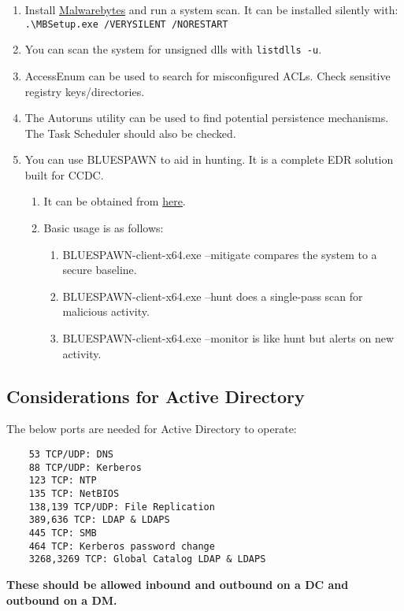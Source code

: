 \documentclass[12pt,letterpaper]{article}
\def\code#1{\textcolor{iris}{\texttt{#1}}}
\def\bf#1{\textbf{#1}}
\begin{document}
\begin{enumerate}
	\item Install \href{https://downloads.malwarebytes.com/file/mb-windows}{Malwarebytes} and run a system scan. It can be installed silently with: \\
		\code{.\textbackslash{}MBSetup.exe /VERYSILENT /NORESTART}
	\item You can scan the system for unsigned dlls with \code{listdlls -u}.
	\item AccessEnum can be used to search for misconfigured ACLs. Check sensitive registry keys/directories.
	\item The Autoruns utility can be used to find potential persistence mechanisms. The Task Scheduler should also be checked.
	\item You can use BLUESPAWN to aid in hunting. It is a complete EDR solution built for CCDC.
	\begin{enumerate}
		\item It can be obtained from \href{https://github.com/ION28/BLUESPAWN/releases/download/v0.5.1-alpha/BLUESPAWN-client-x64.exe}{here}.
		\item Basic usage is as follows:
		\begin{enumerate}
			\item BLUESPAWN-client-x64.exe --mitigate compares the system to a secure baseline.
			\item BLUESPAWN-client-x64.exe --hunt does a single-pass scan for malicious activity.
			\item BLUESPAWN-client-x64.exe --monitor is like hunt but alerts on new activity.
		\end{enumerate}
	\end{enumerate}
\end{enumerate}

\subsection{Considerations for Active Directory}

The below ports are needed for Active Directory to operate:
{ \color{iris} \begin{verbatim}
	53 TCP/UDP: DNS
	88 TCP/UDP: Kerberos
	123 TCP: NTP
	135 TCP: NetBIOS
	138,139 TCP/UDP: File Replication
	389,636 TCP: LDAP & LDAPS
	445 TCP: SMB
	464 TCP: Kerberos password change
	3268,3269 TCP: Global Catalog LDAP & LDAPS
\end{verbatim} }
\bf{These should be allowed inbound and outbound on a DC and outbound on a DM.}
\end{document}
